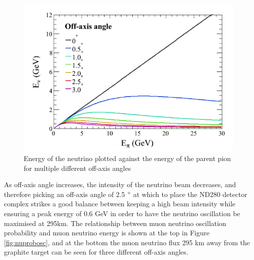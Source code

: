 \begin{figure}
\includegraphics[width=\textwidth]{Figures/energy_angle.PNG}
\caption{Energy of the neutrino plotted against the energy of the parent pion for multiple different off-axis angles}
\label{fig:energyangle}
\end{figure}

As off-axis angle increases, the intensity of the neutrino beam decreases, and therefore picking an off-axis angle of 2.5 $\degree$ at which to place the ND280 detector complex strikes a good balance between keeping a high beam intensity while ensuring a peak energy of 0.6 GeV in order to have the neutrino oscillation be maximised at 295km. The relationship between muon neutrino oscillation probability and muon neutrino energy is shown at the top in Figure \ref{fig:nuprobosc}, and at the bottom the muon neutrino flux 295 km away from the graphite target can be seen for three different off-axis angles.

